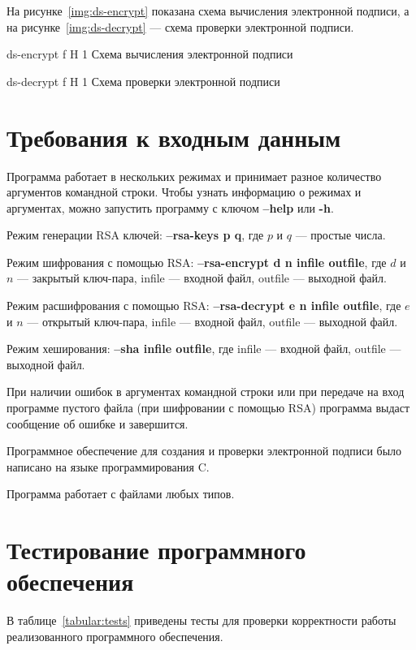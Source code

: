\documentclass{bmstu}
\begin{document}
На рисунке~\ref{img:ds-encrypt} показана схема вычисления электронной подписи, а на рисунке~\ref{img:ds-decrypt} --- схема проверки электронной подписи.

    {ds-encrypt}
    {f}
    {H}
    {1\textwidth}
    {Схема вычисления электронной подписи~\cite{hacker}}
    
    {ds-decrypt}
    {f}
    {H}
    {1\textwidth}
    {Схема проверки электронной подписи~\cite{hacker}}

\chapter{Требования к входным данным}

Программа работает в нескольких режимах и принимает разное количество аргументов командной строки. 
Чтобы узнать информацию о режимах и аргументах, можно запустить программу с ключом \textbf{--help} или \textbf{-h}.

Режим генерации RSA ключей: \textbf{--rsa-keys p q}, где $p$ и $q$ --- простые числа.

Режим шифрования с помощью RSA: \textbf{--rsa-encrypt d n infile outfile}, где $d$ и $n$ --- закрытый ключ-пара, infile --- входной файл, outfile --- выходной файл.

Режим расшифрования с помощью RSA: \textbf{--rsa-decrypt e n infile outfile}, где $e$ и $n$ --- открытый ключ-пара, infile --- входной файл, outfile --- выходной файл.

Режим хеширования: \textbf{--sha infile outfile}, где infile --- входной файл, outfile --- выходной файл.

При наличии ошибок в аргументах командной строки или при передаче на вход программе пустого файла (при шифровании с помощью RSA) программа выдаст сообщение об ошибке и завершится.

Программное обеспечение для создания и проверки электронной подписи было написано на языке программирования C.

Программа работает с файлами любых типов.

\chapter{Тестирование программного обеспечения}

В таблице~\ref{tabular:tests} приведены тесты для проверки корректности работы реализованного программного обеспечения.
\end{document}
